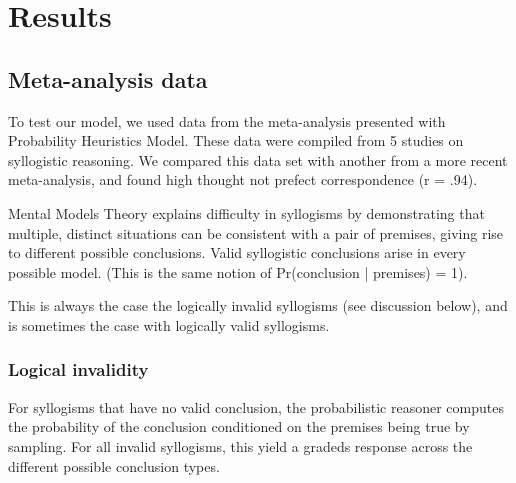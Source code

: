 \documentclass[10pt,letterpaper]{article}
\begin{document}
\section{Results}

\subsection{Meta-analysis data}
To test our model, we used data from the meta-analysis presented with Probability Heuristics Model. These data were compiled from 5 studies on syllogistic reasoning. We compared this data set with another from a more recent meta-analysis, and found high thought not prefect correspondence (r = .94). 

%
%



Mental Models Theory explains difficulty in syllogisms by demonstrating that multiple, distinct situations can be consistent with a pair of premises, giving rise to different possible conclusions. Valid syllogistic conclusions arise in every possible model. (This is the same notion of Pr(conclusion | premises) = 1). 

This is always the case the logically invalid syllogisms (see discussion below), and is sometimes the case with logically valid syllogisms.

\subsubsection{Logical invalidity}
For syllogisms that have no valid conclusion, the probabilistic reasoner computes the probability of the conclusion conditioned on the premises being true by sampling. For all invalid syllogisms, this yield a gradeds response across the different possible conclusion types. 
\end{document}
